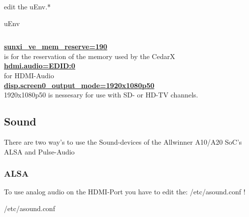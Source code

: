 \documentclass[11pt, a4paper,ngerman]{article}
\begin{document}
edit the uEnv.*  \\

\begin{mintedbox}[breakable=true,
 bottomrule=0.5mm,
 width=\paperwidth-3cm,
 boxsep=1mm, 
 enhanced=true,
 colframe = monoblack,
 drop fuzzy shadow,
 colback = black
 ]{uEnv}%
 

     \inputminted[firstline=1,lastline=28, 
     linenos=true, framesep=2mm, mathescape, numbersep=5pt,tabsize=4,%
]{bash}{includes/uEnv.txt}%

\end{mintedbox}%
\vspace{0.4cm}

\color{monoorange}
\underline{\textbf{sunxi\_ve\_mem\_reserve=190}} \\
\color{black}
is for the reservation of the memory used by the CedarX \\


\color{monoorange}
\underline{\textbf{hdmi.audio=EDID:0}} \\
\color{black}
for HDMI-Audio \\

\color{monoorange}
\underline{\textbf{disp.screen0\_output\_mode=1920x1080p50}} \\
\color{black}
1920x1080p50 is nessesary for use with SD- or HD-TV channels. \\


\newpage %
\subsection{Sound}

There are two way's to use the Sound-devices of the Allwinner A10/A20 SoC's\\

ALSA and Pulse-Audio \\
\subsubsection{ALSA}

To use analog audio on the HDMI-Port you have to edit the: /etc/asound.conf !\\

\begin{mintedbox}[breakable=true,
 bottomrule=0.5mm,
 width=\paperwidth-3cm,
 boxsep=1mm, 
 enhanced=true,
 colframe = monoblack,
 drop fuzzy shadow,
 colback = black
 ]{/etc/asound.conf}%
 

     \inputminted[firstline=3,lastline=32, 
     linenos=true, framesep=2mm, mathescape, numbersep=5pt,tabsize=4,%
]{apacheconf}{includes/asound.conf}%

\end{mintedbox}%
\vspace{0.2cm}
\end{document}
